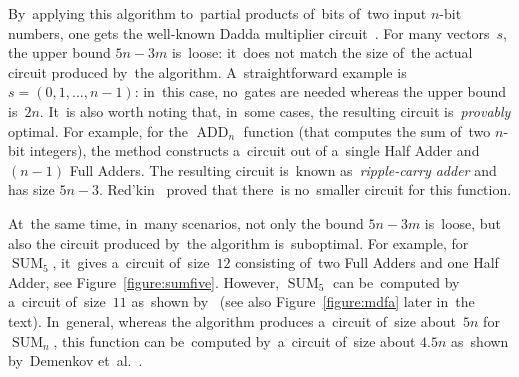 \documentclass[a4paper, UKenglish, cleveref, autoref,  thm-restate]{lipics-v2021}
\DeclareMathOperator{\SUM}{SUM}
\DeclareMathOperator{\ADD}{ADD}
\begin{document}
    By~applying this algorithm to~partial products of~bits of~two input $n$-bit numbers, one gets the well-known Dadda multiplier circuit~\cite{dadda}.
    For many vectors~$s$, the upper bound
    $5n-3m$ is~loose:
    it~does not match the size of~the actual circuit
    produced by~the algorithm.
    A~straightforward example is $s=(0,1,\dotsc,n-1)$:
    in~this case, no~gates are needed whereas the upper bound is~$2n$.
    It~is also worth noting that, in~some cases, the resulting circuit
    is~\emph{provably} optimal.
    For example, for the $\ADD_n$ function (that computes the sum of~two $n$-bit integers),
    the method constructs a~circuit out of a~single Half Adder and $(n-1)$
    Full Adders. The resulting circuit is~known as~\emph{ripple-carry adder} and has size $5n-3$.
    Red'kin~\cite{Red81} proved that there~is no~smaller circuit
    for this function.

    At~the same time, in~many scenarios,
    not only the bound $5n-3m$ is~loose,
    but also the circuit produced by~the algorithm
    is~suboptimal.
    For example, for $\SUM_5$, it~gives a~circuit of~size~$12$ consisting
    of~two Full Adders and one Half Adder, see Figure~\ref{figure:sumfive}.
    However, $\SUM_5$
    can be~computed by a~circuit of~size~$11$ as~shown by~\cite{DBLP:conf/mfcs/KulikovPS22} (see also Figure~\ref{figure:mdfa} later in~the text).
    In~general, whereas the algorithm produces a~circuit of~size about~$5n$
    for $\SUM_n$, this function can be~computed by~a~circuit of~size about $4.5n$
    as~shown by~Demenkov et~al.~\cite{DBLP:journals/ipl/DemenkovKKY10}.
\end{document}
